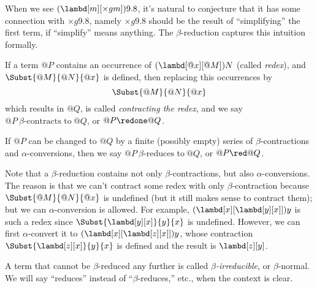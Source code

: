 \documentclass[../../../include/open-logic-section]{subfiles}
\begin{document}

When we see $(\lambd[m][\times g m]) 9.8$, it's natural to
conjecture that it has some connection with $\times g 9.8$,
namely  $\times g 9.8$ should be the result of ``simplifying'' the first term, if
``simplify'' means anything. The $\beta$-reduction captures this
intuition formally.

\begin{defn}
  If a term $@P$ contains an occurrence of $(\lambd[@x][@M])N$ (called \emph{redex}), and $\Subst{@M}{@N}{@x}$
  is defined, then replacing this occurrences by 
  \begin{equation*}
    \Subst{@M}{@N}{@x}
  \end{equation*}
  which results in $@Q$, is called \emph{contracting the redex}, and we
  say $@P ~\beta\text{-contracts to} ~@Q$, or $@P \redone @Q$. 
\end{defn}

\begin{defn}
 If $@P$ can be changed to $@Q$ by a finite (possibly empty) series of
  $\beta$-contractions and $\alpha$-conversions, then we say $@P
  ~\beta\text{-reduces to}~@Q$, or $@P \red @Q$.
\end{defn}

Note that a $\beta$-reduction contains not only $\beta$-contractions,
but also $\alpha$-conversions. The reason is that we can't contract
some redex with only $\beta$-contraction because $\Subst{@M}{@N}{@x}$ is
undefined (but it still makes sense to contract them); but we can $\alpha$-conversion is allowed. For example,
$(\lambd[x][\lambd[y][x]])y$ is such a redex since
$\Subst{\lambd[y][x]}{y}{x}$ is undefined. However, we can first
$\alpha$-convert it to $(\lambd[x][\lambd[z][x]])y$, whose contraction
$\Subst{\lambd[z][x]}{y}{x}$ is defined and the result is
$\lambd[z][y]$. 

\begin{defn}
A term that cannot be $\beta$-reduced any further is called \emph{$\beta$-irreducible}, or
$\beta$-normal. We will say ``reduces'' instead of ``$\beta$-reduces,''
etc., when the context is clear.
\end{defn}
\end{document}
